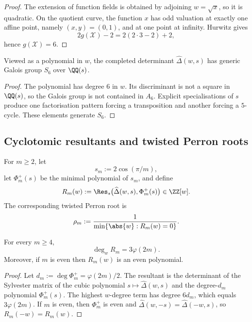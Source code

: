 \begin{proof}
The extension of function fields is obtained by adjoining
\(w=\sqrt{x}\), so it is quadratic. On the quotient curve, the function
\(x\) has odd valuation at exactly one affine point, namely
\((x,y)=(0,1)\), and at one point at infinity. Hurwitz gives
\[
  2g(\mathcal X)-2=2(2\cdot 3-2)+2,
\]
hence \(g(\mathcal X)=6\).
\end{proof}

\begin{proposition}
  \label{prop:sync-hatdelta-galois-s6-generic}
  Viewed as a polynomial in \(w\), the completed determinant
  \(\widehat\Delta(w,s)\) has generic Galois group \(S_6\) over
  \(\QQ(s)\).
\end{proposition}

\begin{proof}
The polynomial has degree \(6\) in \(w\). Its discriminant is not a
square in \(\QQ(s)\), so the Galois group is not contained in \(A_6\).
Explicit specialisations of \(s\) produce one factorisation pattern
forcing a transposition and another forcing a \(5\)-cycle. These
elements generate \(S_6\).
\end{proof}

\subsection{Cyclotomic resultants and twisted Perron roots}

For \(m\ge 2\), let
\[
  s_m:=2\cos(\pi/m),
\]
let \(\Phi_m^+(s)\) be the minimal polynomial of \(s_m\), and define
\[
  R_m(w):=\Res_s\bigl(\widehat\Delta(w,s),\Phi_m^+(s)\bigr)\in\ZZ[w].
\]
The corresponding twisted Perron root is
\[
  \rho_m:=\frac{1}{\min\{\abs{w}:R_m(w)=0\}}.
\]

\begin{theorem}
  \label{thm:sync-cyclotomic-degree-law}
  For every \(m\ge 4\),
  \[
    \deg_w R_m=3\varphi(2m).
  \]
  Moreover, if \(m\) is even then \(R_m(w)\) is an even polynomial.
\end{theorem}

\begin{proof}
Let \(d_m:=\deg\Phi_m^+=\varphi(2m)/2\). The resultant is the
determinant of the Sylvester matrix of the cubic polynomial
\(s\mapsto\widehat\Delta(w,s)\) and the degree-\(d_m\) polynomial
\(\Phi_m^+(s)\). The highest \(w\)-degree term has degree \(6d_m\),
which equals \(3\varphi(2m)\). If \(m\) is even, then \(\Phi_m^+\) is
even and \(\widehat\Delta(w,-s)=\widehat\Delta(-w,s)\), so
\(R_m(-w)=R_m(w)\).
\end{proof}

